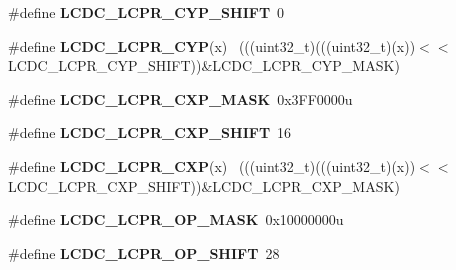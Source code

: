 \begin{DoxyCompactItemize}
\item 
\hypertarget{group___l_c_d_c___register___masks_ga390b4b415f926f72f3fd40946072aed7}{}\#define {\bfseries L\+C\+D\+C\+\_\+\+L\+C\+P\+R\+\_\+\+C\+Y\+P\+\_\+\+S\+H\+I\+F\+T}~0\label{group___l_c_d_c___register___masks_ga390b4b415f926f72f3fd40946072aed7}

\item 
\hypertarget{group___l_c_d_c___register___masks_gab42cc97275da466b7d24a10c3209f1ff}{}\#define {\bfseries L\+C\+D\+C\+\_\+\+L\+C\+P\+R\+\_\+\+C\+Y\+P}(x)                                              ~(((uint32\+\_\+t)(((uint32\+\_\+t)(x))$<$$<$L\+C\+D\+C\+\_\+\+L\+C\+P\+R\+\_\+\+C\+Y\+P\+\_\+\+S\+H\+I\+F\+T))\&L\+C\+D\+C\+\_\+\+L\+C\+P\+R\+\_\+\+C\+Y\+P\+\_\+\+M\+A\+S\+K)\label{group___l_c_d_c___register___masks_gab42cc97275da466b7d24a10c3209f1ff}

\item 
\hypertarget{group___l_c_d_c___register___masks_gaa92cff3645a22422dce63af68e9bc134}{}\#define {\bfseries L\+C\+D\+C\+\_\+\+L\+C\+P\+R\+\_\+\+C\+X\+P\+\_\+\+M\+A\+S\+K}~0x3\+F\+F0000u\label{group___l_c_d_c___register___masks_gaa92cff3645a22422dce63af68e9bc134}

\item 
\hypertarget{group___l_c_d_c___register___masks_ga8cf3bda829d4bd5b81edbcb8ae3cc655}{}\#define {\bfseries L\+C\+D\+C\+\_\+\+L\+C\+P\+R\+\_\+\+C\+X\+P\+\_\+\+S\+H\+I\+F\+T}~16\label{group___l_c_d_c___register___masks_ga8cf3bda829d4bd5b81edbcb8ae3cc655}

\item 
\hypertarget{group___l_c_d_c___register___masks_gadc2731ffc9039eb2bcf23e50f1076b12}{}\#define {\bfseries L\+C\+D\+C\+\_\+\+L\+C\+P\+R\+\_\+\+C\+X\+P}(x)                                              ~(((uint32\+\_\+t)(((uint32\+\_\+t)(x))$<$$<$L\+C\+D\+C\+\_\+\+L\+C\+P\+R\+\_\+\+C\+X\+P\+\_\+\+S\+H\+I\+F\+T))\&L\+C\+D\+C\+\_\+\+L\+C\+P\+R\+\_\+\+C\+X\+P\+\_\+\+M\+A\+S\+K)\label{group___l_c_d_c___register___masks_gadc2731ffc9039eb2bcf23e50f1076b12}

\item 
\hypertarget{group___l_c_d_c___register___masks_ga0f60001706af28e7a7c5465215dbe3b0}{}\#define {\bfseries L\+C\+D\+C\+\_\+\+L\+C\+P\+R\+\_\+\+O\+P\+\_\+\+M\+A\+S\+K}~0x10000000u\label{group___l_c_d_c___register___masks_ga0f60001706af28e7a7c5465215dbe3b0}

\item 
\hypertarget{group___l_c_d_c___register___masks_ga68c02233183cb573ceba715ee6a70a18}{}\#define {\bfseries L\+C\+D\+C\+\_\+\+L\+C\+P\+R\+\_\+\+O\+P\+\_\+\+S\+H\+I\+F\+T}~28\label{group___l_c_d_c___register___masks_ga68c02233183cb573ceba715ee6a70a18}


\end{DoxyCompactItemize}
